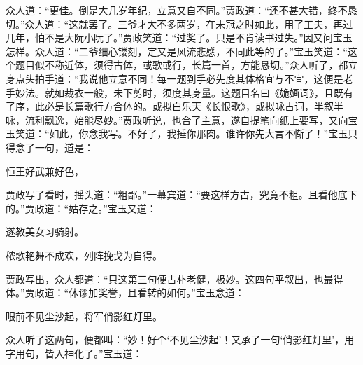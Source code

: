 \begin{parag}
    众人道：“更佳。倒是大几岁年纪，立意又自不同。”贾政道：“还不甚大错，终不恳切。”众人道：“这就罢了。三爷才大不多两岁，在未冠之时如此，用了工夫，再过几年，怕不是大阮小阮了。”贾政笑道：“过奖了。只是不肯读书过失。”因又问宝玉怎样。众人道：“二爷细心镂刻，定又是风流悲感，不同此等的了。”宝玉笑道：“这个题目似不称近体，须得古体，或歌或行，长篇一首，方能恳切。”众人听了，都立身点头拍手道：“我说他立意不同！每一题到手必先度其体格宜与不宜，这便是老手妙法。就如裁衣一般，未下剪时，须度其身量。这题目名曰《姽婳词》，且既有了序，此必是长篇歌行方合体的。或拟白乐天《长恨歌》，或拟咏古词，半叙半咏，流利飘逸，始能尽妙。”贾政听说，也合了主意，遂自提笔向纸上要写，又向宝玉笑道：“如此，你念我写。不好了，我捶你那肉。谁许你先大言不惭了！”宝玉只得念了一句，道是：
\end{parag}


\begin{poem}
    \begin{pl}
        恒王好武兼好色，
    \end{pl}
\end{poem}

\begin{parag}
    贾政写了看时，摇头道：“粗鄙。”一幕宾道：“要这样方古，究竟不粗。且看他底下的。”贾政道：“姑存之。”宝玉又道：
\end{parag}


\begin{poem}
    \begin{pl}
        遂教美女习骑射。
    \end{pl}
    \begin{pl}
        秾歌艳舞不成欢，列阵挽戈为自得。
    \end{pl}

\end{poem}


\begin{parag}
    贾政写出，众人都道：“只这第三句便古朴老健，极妙。这四句平叙出，也最得体。”贾政道：“休谬加奖誉，且看转的如何。”宝玉念道：
\end{parag}


\begin{poem}
    \begin{pl}
        眼前不见尘沙起，将军俏影红灯里。
    \end{pl}

\end{poem}


\begin{parag}
    众人听了这两句，便都叫：“妙！好个‘不见尘沙起’！又承了一句‘俏影红灯里’，用字用句，皆入神化了。”宝玉道：
\end{parag}


